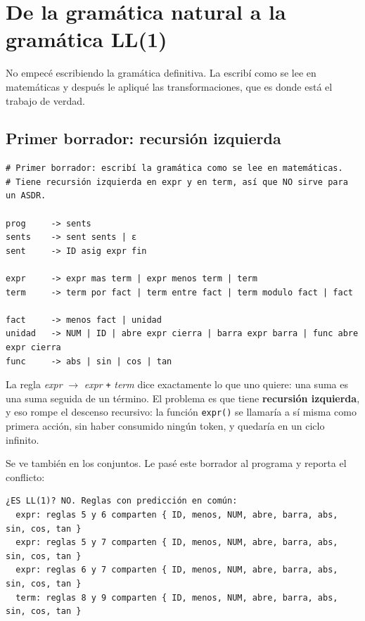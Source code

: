\documentclass[12pt,letterpaper]{article}
\newcommand{\tk}[1]{\texttt{#1}}
\newcommand{\nt}[1]{\textit{#1}}
\begin{document}
\section{De la gramática natural a la gramática LL(1)}

No empecé escribiendo la gramática definitiva. La escribí como se lee en matemáticas y después le apliqué las transformaciones, que es donde está el trabajo de verdad.

\subsection{Primer borrador: recursión izquierda}

\noindent\begin{minipage}{\linewidth}
\begin{lstlisting}[caption={\texttt{grammars/borrador1\_recursion.txt}: la versión natural.}]
# Primer borrador: escribí la gramática como se lee en matemáticas.
# Tiene recursión izquierda en expr y en term, así que NO sirve para un ASDR.

prog     -> sents
sents    -> sent sents | ε
sent     -> ID asig expr fin

expr     -> expr mas term | expr menos term | term
term     -> term por fact | term entre fact | term modulo fact | fact

fact     -> menos fact | unidad
unidad   -> NUM | ID | abre expr cierra | barra expr barra | func abre expr cierra
func     -> abs | sin | cos | tan
\end{lstlisting}
\end{minipage}

La regla \nt{expr} $\rightarrow$ \nt{expr} \tk{+} \nt{term} dice exactamente lo que uno quiere: una suma es una suma seguida de un término. El problema es que tiene \textbf{recursión izquierda}, y eso rompe el descenso recursivo: la función \tk{expr()} se llamaría a sí misma como primera acción, sin haber consumido ningún token, y quedaría en un ciclo infinito.

Se ve también en los conjuntos. Le pasé este borrador al programa y reporta el conflicto:

\begin{lstlisting}
¿ES LL(1)? NO. Reglas con predicción en común:
  expr: reglas 5 y 6 comparten { ID, menos, NUM, abre, barra, abs, sin, cos, tan }
  expr: reglas 5 y 7 comparten { ID, menos, NUM, abre, barra, abs, sin, cos, tan }
  expr: reglas 6 y 7 comparten { ID, menos, NUM, abre, barra, abs, sin, cos, tan }
  term: reglas 8 y 9 comparten { ID, menos, NUM, abre, barra, abs, sin, cos, tan }
\end{lstlisting}
\end{document}
